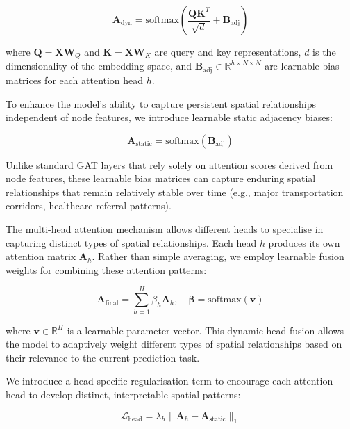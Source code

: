 \documentclass[lettersize, journal]{IEEEtran}
\begin{document}
\begin{equation}
\mathbf{A}_{\text{dyn}} = \text{softmax}\left(\frac{\mathbf{Q}\mathbf{K}^T}{\sqrt{d}} + \mathbf{B}_{\text{adj}}\right)
\end{equation}

where $\mathbf{Q} = \mathbf{X}\mathbf{W}_Q$ and $\mathbf{K} = \mathbf{X}\mathbf{W}_K$ are query and key representations, $d$ is the dimensionality of the embedding space, and $\mathbf{B}_{\text{adj}} \in \mathbb{R}^{h \times N \times N}$ are learnable bias matrices for each attention head $h$.

To enhance the model's ability to capture persistent spatial relationships independent of node features, we introduce learnable static adjacency biases:

\begin{equation}
\mathbf{A}_{\text{static}} = \text{softmax}(\mathbf{B}_{\text{adj}})
\end{equation}

Unlike standard GAT layers that rely solely on attention scores derived from node features, these learnable bias matrices can capture enduring spatial relationships that remain relatively stable over time (e.g., major transportation corridors, healthcare referral patterns).

The multi-head attention mechanism allows different heads to specialise in capturing distinct types of spatial relationships. Each head $h$ produces its own attention matrix $\mathbf{A}_h$. Rather than simple averaging, we employ learnable fusion weights for combining these attention patterns:

\begin{equation}
\mathbf{A}_{\text{final}} = \sum_{h=1}^H \beta_h \mathbf{A}_h, \quad \boldsymbol{\beta} = \text{softmax}(\mathbf{v})
\end{equation}

where $\mathbf{v} \in \mathbb{R}^H$ is a learnable parameter vector. This dynamic head fusion allows the model to adaptively weight different types of spatial relationships based on their relevance to the current prediction task.

We introduce a head-specific regularisation term to encourage each attention head to develop distinct, interpretable spatial patterns:

\begin{equation}
\mathcal{L}_{\text{head}} = \lambda_{h}\|\mathbf{A}_{h} - \mathbf{A}_{\text{static}}\|_1
\end{equation}
\end{document}
